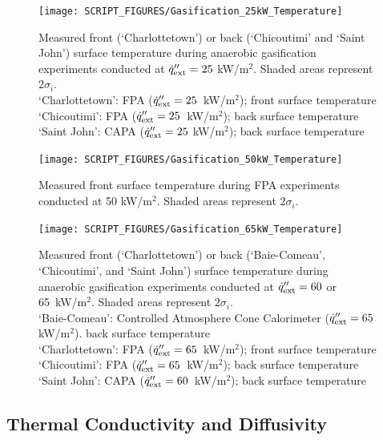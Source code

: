 \documentclass{book}
\begin{document}
\begin{figure}[h!]
  \centering
  \texttt{[image: SCRIPT\_FIGURES/Gasification\_25kW\_Temperature]}
  \caption{Measured front (‘Charlottetown’) or back (‘Chicoutimi’ and ‘Saint John’) surface temperature during anaerobic gasification experiments conducted at $\dot{q}_{\rm ext}'' = 25$ kW/m$^2$. Shaded areas represent $2\sigma_i$. \\
‘Charlottetown’:  FPA ($\dot{q}_{\rm ext}'' = 25$~kW/m$^2$); front surface temperature \\
‘Chicoutimi’:   FPA ($\dot{q}_{\rm ext}'' = 25$~kW/m$^2$); back surface temperature \\
‘Saint John’:   CAPA ($\dot{q}_{\rm ext}'' = 25$ kW/m$^2$); back surface temperature}
  \label{Fig:Gasification_25kW_Temperature}
\end{figure}

\begin{figure}[h!]
  \centering
  \texttt{[image: SCRIPT\_FIGURES/Gasification\_50kW\_Temperature]}
  \caption{Measured front surface temperature during FPA experiments conducted at 50 kW/m$^2$. Shaded areas represent $2\sigma_i$.}
  \label{Fig:Gasification_50kW_Temperature}
\end{figure}

\begin{figure}[h!]
  \centering
  \texttt{[image: SCRIPT\_FIGURES/Gasification\_65kW\_Temperature]}
  \caption{Measured front (‘Charlottetown’) or back (‘Baie-Comeau’, ‘Chicoutimi’, and ‘Saint John’) surface temperature during anaerobic gasification experiments conducted at $\dot{q}_{\rm ext}'' = 60$ or 65~kW/m$^2$. Shaded areas represent $2\sigma_i$. \\
 ‘Baie-Comeau’:  Controlled Atmosphere Cone Calorimeter ($\dot{q}_{\rm ext}'' = 65$ kW/m$^2$). back surface temperature \\
‘Charlottetown’:  FPA ($\dot{q}_{\rm ext}'' = 65$~kW/m$^2$); front surface temperature \\
‘Chicoutimi’:   FPA ($\dot{q}_{\rm ext}'' = 65$~kW/m$^2$); back surface temperature  \\
‘Saint John’:   CAPA ($\dot{q}_{\rm ext}'' = 60$~kW/m$^2$); back surface temperature}
  \label{Fig:Gasification_65kW_Temperature}
\end{figure}


\subsection{Thermal Conductivity and Diffusivity}
\end{document}
